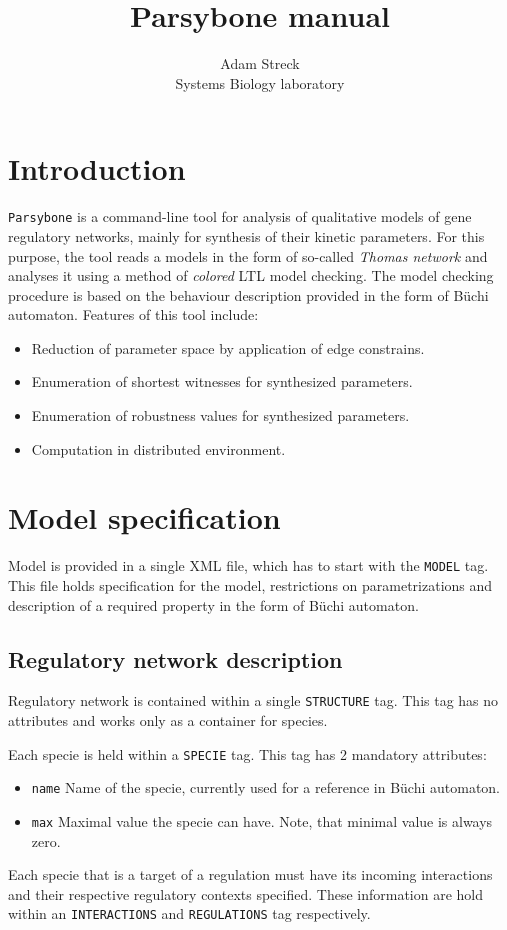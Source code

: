 \documentclass[12pt]{article}
\title{Parsybone manual}
\author{Adam Streck \\
		Systems Biology laboratory}
\begin{document}
\maketitle

\section{Introduction}
\texttt{Parsybone} is a command-line tool for analysis of qualitative models of gene regulatory networks, mainly for synthesis of their kinetic parameters. For this purpose, the tool reads a models in the form of so-called \emph{Thomas network} and analyses it using a method of \emph{colored} LTL model checking. The model checking procedure is based on the behaviour description provided in the form of B\"uchi automaton. Features of this tool include:

\begin{itemize}
\item Reduction of parameter space by application of edge constrains.
\item Enumeration of shortest witnesses for synthesized parameters.
\item Enumeration of robustness values for synthesized parameters.
\item Computation in distributed environment.
\end{itemize}
\section{Model specification}
Model is provided in a single XML file, which has to start with the \texttt{MODEL} tag. This file holds specification for the model, restrictions on parametrizations and description of a required property in the form of B\"uchi automaton.

\subsection{Regulatory network description}
Regulatory network is contained within a single \texttt{STRUCTURE} tag. This tag has no attributes
and works only as a container for species. 

Each specie is held within a \texttt{SPECIE} tag. This tag has 2 mandatory attributes:
\begin{itemize}
\item \texttt{name} Name of the specie, currently used for a reference in B\"{u}chi automaton.
\item \texttt{max} Maximal value the specie can have. Note, that minimal value is always zero.
\end{itemize}
Each specie that is a target of a regulation must have its incoming interactions and their respective regulatory contexts specified. These information are hold within an \texttt{INTERACTIONS} and \texttt{REGULATIONS} tag respectively.
\end{document}
